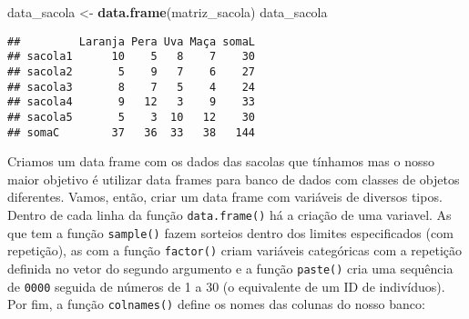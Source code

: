 \documentclass[]{book}
\newenvironment{Shaded}{\begin{snugshade}}{\end{snugshade}}
\newcommand{\KeywordTok}[1]{\textcolor[rgb]{0.13,0.29,0.53}{\textbf{#1}}}
\newcommand{\NormalTok}[1]{#1}
\newcommand{\StringTok}[1]{\textcolor[rgb]{0.31,0.60,0.02}{#1}}
\theoremstyle{definition}
\theoremstyle{definition}
\theoremstyle{definition}
\theoremstyle{remark}
\begin{document}
\begin{Shaded}
\begin{Highlighting}[]
\NormalTok{data_sacola <-}\StringTok{ }\KeywordTok{data.frame}\NormalTok{(matriz_sacola)}
\NormalTok{data_sacola}
\end{Highlighting}
\end{Shaded}

\begin{verbatim}
##         Laranja Pera Uva Maça somaL
## sacola1      10    5   8    7    30
## sacola2       5    9   7    6    27
## sacola3       8    7   5    4    24
## sacola4       9   12   3    9    33
## sacola5       5    3  10   12    30
## somaC        37   36  33   38   144
\end{verbatim}

Criamos um data frame com os dados das sacolas que tínhamos mas o nosso maior objetivo é utilizar data frames para banco de dados com classes de objetos diferentes. Vamos, então, criar um data frame com variáveis de diversos tipos. Dentro de cada linha da função \texttt{data.frame()} há a criação de uma variavel. As que tem a função \texttt{sample()} fazem sorteios dentro dos limites especificados (com repetição), as com a função \texttt{factor()} criam variáveis categóricas com a repetição definida no vetor do segundo argumento e a função \texttt{paste()} cria uma sequência de \texttt{0000} seguida de números de 1 a 30 (o equivalente de um ID de indivíduos). Por fim, a função \texttt{colnames()} define os nomes das colunas do nosso banco:
\end{document}
